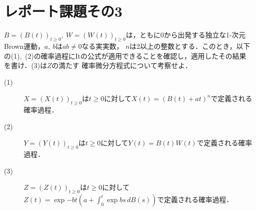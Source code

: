 \section{レポート課題その3}
$B=(B(t))_{t \geq 0},\ W = (W(t))_{t \geq 0}$は，ともに0から出発する独立な1-次元Brown運動，$a,\ b$は$ab \neq 0$なる実実数，
$n$は2以上の整数とする．このとき，以下の(1),\ (2)の確率過程にItの公式が適用できることを確認し，適用したその結果を書け．(3)は$Z$の満たす
確率微分方程式について考察せよ．
\begin{description}
	\item[(1)] $X = (X(t))_{t \geq 0}$は$t \geq 0$に対して$X(t) = \left(B(t) + at\right)^n$で定義される確率過程．
	\item[(2)] $Y = (Y(t))_{t \geq 0}$は$t \geq 0$に対して$Y(t) = B(t)W(t)$で定義される確率過程．
	\item[(3)] $Z = (Z(t))_{t \geq 0}$は$t \geq 0$に対して$Z(t) = \exp{-bt} \left(a + \int_{0}^{t} \exp{bs}\, dB(s) \right)$で定義される確率過程．
\end{description}


